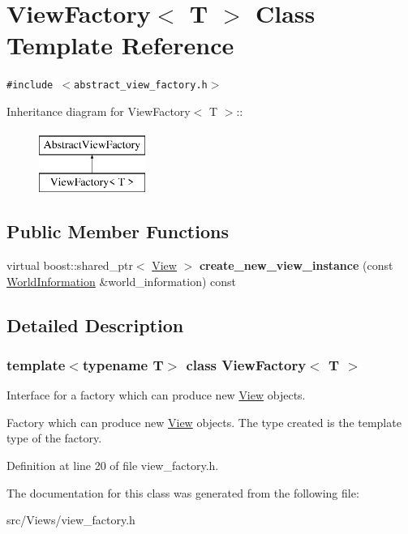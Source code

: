 \hypertarget{class_view_factory}{
\section{ViewFactory$<$ T $>$ Class Template Reference}
\label{class_view_factory}
}
{\tt \#include $<$abstract\_\-view\_\-factory.h$>$}

Inheritance diagram for ViewFactory$<$ T $>$::\begin{figure}[H]
\begin{center}
\leavevmode
\includegraphics[height=2cm]{class_view_factory}
\end{center}
\end{figure}
\subsection*{Public Member Functions}
\begin{CompactItemize}
\item 
\hypertarget{class_view_factory_fdb0a2655e9918e4fa0b81aeb44109f6}{
virtual boost::shared\_\-ptr$<$ \hyperlink{class_view}{View} $>$ \textbf{create\_\-new\_\-view\_\-instance} (const \hyperlink{class_world_information}{WorldInformation} \&world\_\-information) const }
\label{class_view_factory_fdb0a2655e9918e4fa0b81aeb44109f6}

\end{CompactItemize}


\subsection{Detailed Description}
\subsubsection*{template$<$typename T$>$ class ViewFactory$<$ T $>$}

Interface for a factory which can produce new \hyperlink{class_view}{View} objects.

Factory which can produce new \hyperlink{class_view}{View} objects. The type created is the template type of the factory. 

Definition at line 20 of file view\_\-factory.h.

The documentation for this class was generated from the following file:\begin{CompactItemize}
\item 
src/Views/view\_\-factory.h\end{CompactItemize}
